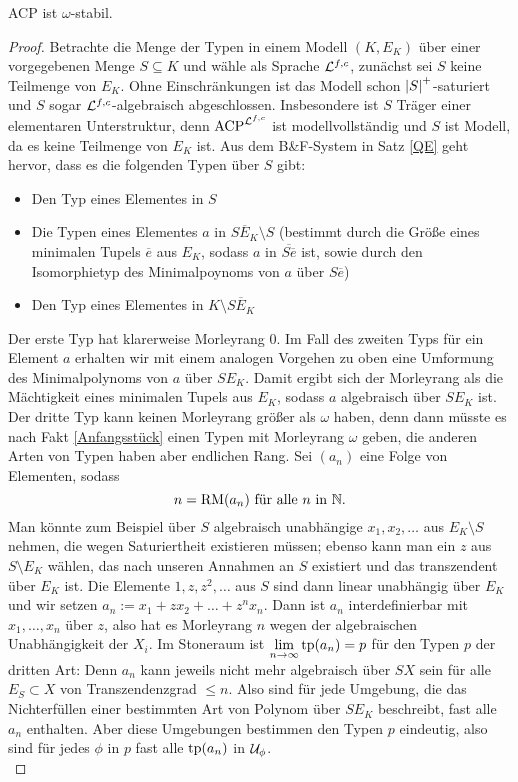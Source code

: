     \begin{theorem}
    	ACP ist $\omega$-stabil.
    \end{theorem}
    \begin{proof}
    	Betrachte die Menge der Typen in einem Modell $(K,E_K)$ über einer vorgegebenen Menge $S\subseteq K$ und wähle als Sprache $\mathcal{L}^{f,c}$, zunächst sei $S$ keine Teilmenge von $E_K$. Ohne Einschränkungen ist das Modell schon ${\left| S \right|}^+$-saturiert und $S$ sogar $\mathcal{L}^{f,c}$-algebraisch abgeschlossen. Insbesondere ist $S$ Träger einer elementaren Unterstruktur, denn $\operatorname{ACP}^{\mathcal{L}^{f,c}}$ ist modellvollständig und $S$ ist Modell, da es keine Teilmenge von $E_K$ ist. Aus dem B\&F-System in Satz \ref{QE} geht hervor, dass es die folgenden Typen über $S$ gibt:
    	\begin{itemize}
    		\item Den Typ eines Elementes in $S$
    		\item Die Typen eines Elementes $a$ in $\overline{SE_K}\setminus S$ (bestimmt durch die Größe eines minimalen Tupels $\overline{e}$ aus $E_K$, sodass $a$ in $\overline{S\overline{e}}$ ist, sowie durch den Isomorphietyp des Minimalpoynoms von $a$ über $S\overline{e}$)
    		\item Den Typ eines Elementes in $K\setminus\overline{SE_K}$
    	\end{itemize}
        Der erste Typ hat klarerweise Morleyrang 0. Im Fall des zweiten Typs für ein Element $a$ erhalten wir mit einem analogen Vorgehen zu oben eine Umformung des Minimalpolynoms von $a$ über $SE_K$. Damit ergibt sich der Morleyrang als die Mächtigkeit eines minimalen Tupels aus $E_K$, sodass $a$ algebraisch über $SE_K$ ist.\\
        Der dritte Typ kann keinen Morleyrang größer als $\omega$ haben, denn dann müsste es nach Fakt \ref{Anfangsstück} einen Typen mit Morleyrang $\omega$ geben, die anderen Arten von Typen haben aber endlichen Rang. Sei $(a_n)$ eine Folge von Elementen, sodass $$n=\operatorname{RM}(a_n)\text{ für alle }n\text{ in }\mathbb{N}.$$ Man könnte zum Beispiel über $S$ algebraisch unabhängige $x_1,x_2,\dots$ aus $E_K\setminus S$ nehmen, die wegen Saturiertheit existieren müssen; ebenso kann man ein $z$ aus $S\setminus E_K$ wählen, das nach unseren Annahmen an $S$ existiert und das transzendent über $E_K$ ist. Die Elemente $1,z,z^2,\dots$ aus $S$ sind dann linear unabhängig über $E_K$ und wir setzen $a_n:=x_1+zx_2+\dots+z^nx_n$. Dann ist $a_n$ interdefinierbar mit $x_1,\dots,x_n$ über $z$, also hat es Morleyrang $n$ wegen der algebraischen Unabhängigkeit der $X_i$. Im Stoneraum ist $\lim\limits_{n\rightarrow\infty}\operatorname{tp}(a_n)=p$ für den Typen $p$ der dritten Art: Denn $a_n$ kann jeweils nicht mehr algebraisch über $SX$ sein für alle $E_S\subset X$ von Transzendenzgrad $\leq n$. Also sind für jede Umgebung, die das Nichterfüllen einer bestimmten Art von Polynom über $SE_K$ beschreibt, fast alle $a_n$ enthalten. Aber diese Umgebungen bestimmen den Typen $p$ eindeutig, also sind für jedes $\phi$ in $p$ fast alle $\operatorname{tp}(a_n)$ in $\mathcal{U}_\phi$.\\

\end{proof}
